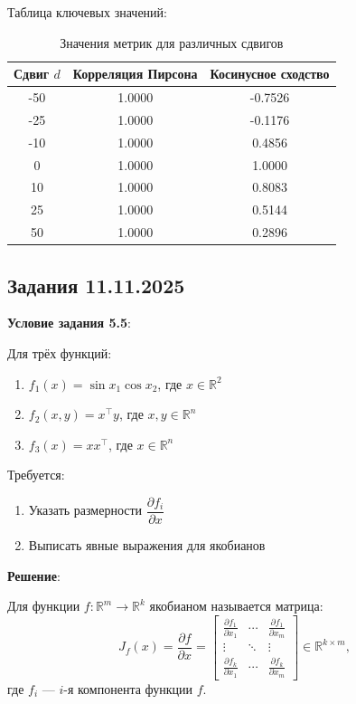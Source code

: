 \documentclass[pract]{SCWorks}
\begin{document}
    Таблица ключевых значений:
    \begin{table}[H]
    \centering
    \begin{tabular}{|c|c|c|}
    \hline
    \textbf{Сдвиг $d$} & \textbf{Корреляция Пирсона} & \textbf{Косинусное сходство} \\
    \hline
    -50 & 1.0000 & -0.7526 \\
    -25 & 1.0000 & -0.1176 \\
    -10 & 1.0000 & 0.4856 \\
    0 & 1.0000 & 1.0000 \\
    10 & 1.0000 & 0.8083 \\
    25 & 1.0000 & 0.5144 \\
    50 & 1.0000 & 0.2896 \\
    \hline
    \end{tabular}
    \caption{Значения метрик для различных сдвигов}
    \label{tab:metrics}
    \end{table}

    \subsection{Задания 11.11.2025}

    \textbf{Условие задания 5.5}:

    Для трёх функций:
    \begin{enumerate}
        \item $f_1(x) = \sin x_1 \cos x_2$, где $x \in \mathbb{R}^2$
        \item $f_2(x, y) = x^\top y$, где $x, y \in \mathbb{R}^n$
        \item $f_3(x) = xx^\top$, где $x \in \mathbb{R}^n$
    \end{enumerate}

    Требуется:
    \begin{enumerate}[label=\alph*)]
        \item Указать размерности $\dfrac{\partial f_i}{\partial x}$
        \item Выписать явные выражения для якобианов
    \end{enumerate}

    \textbf{Решение}:

    Для функции $f: \mathbb{R}^m \to \mathbb{R}^k$ якобианом называется матрица:
    \[
    J_f(x) = \frac{\partial f}{\partial x} =
    \begin{bmatrix}
    \frac{\partial f_1}{\partial x_1} & \cdots & \frac{\partial f_1}{\partial x_m} \\
    \vdots & \ddots & \vdots \\
    \frac{\partial f_k}{\partial x_1} & \cdots & \frac{\partial f_k}{\partial x_m}
    \end{bmatrix} \in \mathbb{R}^{k \times m},
    \]
    где $f_i$ — $i$-я компонента функции $f$.
\end{document}
